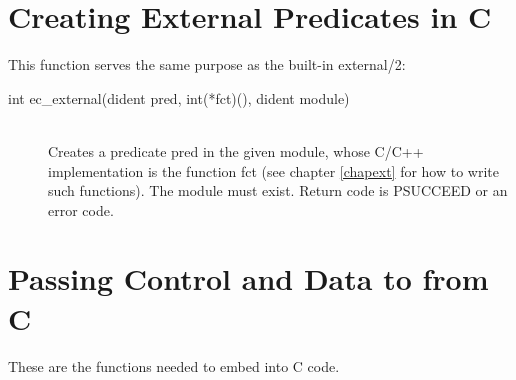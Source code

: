 \section{Creating External Predicates in C}
This function serves the same purpose as the {\eclipse} built-in external/2:
\begin{description}
\item[int ec_external(dident pred, int(*fct)(), dident module)]\ \\
	Creates a predicate pred in the given module, whose C/C++
	implementation is the function fct (see chapter \ref{chapext}
	for how to write such functions). The module must exist.
	Return code is PSUCCEED or an error code.
\end{description}


\section{Passing Control and Data to {\eclipse} from C}
These are the functions needed to embed {\eclipse} into C code.
